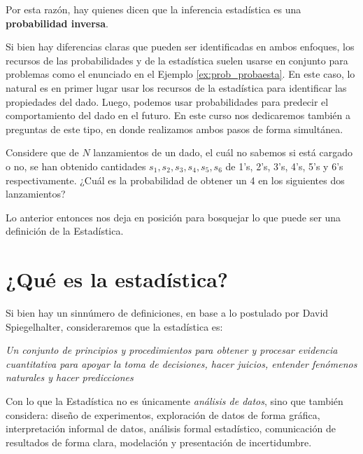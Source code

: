 Por esta razón, hay quienes dicen que la inferencia estadística es una \textbf{probabilidad inversa}.

Si bien hay diferencias claras que pueden ser identificadas en ambos enfoques, los recursos de las probabilidades y de la estadística suelen usarse en conjunto para problemas como el enunciado en el Ejemplo \ref{ex:prob_probaesta}. En este caso, lo natural es en primer lugar usar los recursos de la estadística para identificar las propiedades del dado. Luego, podemos usar probabilidades para predecir el comportamiento del dado en el futuro. En este curso nos dedicaremos también a preguntas de este tipo, en donde realizamos ambos pasos de forma simultánea. 

\begin{example}
\label{ex:prob_probaesta}
Considere que de $N$ lanzamientos de un dado, el cuál no sabemos si está cargado o no, se han obtenido cantidades $s_1,s_2,s_3,s_4,s_5,s_6$ de 1's, 2's, 3's, 4's, 5's y 6's respectivamente. ¿Cuál es la probabilidad de obtener un 4 en los siguientes dos lanzamientos?
\end{example}

Lo anterior entonces nos deja en posición para bosquejar lo que puede ser una definición de la Estadística. 

\section{¿Qué es la estadística?}

Si bien hay un sinnúmero de definiciones, en base a lo postulado por David Spiegelhalter, consideraremos que la estadística es: 
\begin{center}
\it 
    Un conjunto de principios y procedimientos para obtener y procesar evidencia cuantitativa para apoyar la toma de decisiones, hacer juicios, entender fenómenos naturales y hacer predicciones
\end{center}

Con lo que la Estadística no es únicamente \emph{análisis de datos}, sino que también considera: diseño de experimentos, exploración de datos de forma gráfica, interpretación informal de datos, análisis formal estadístico, comunicación de resultados de forma clara, modelación y presentación de incertidumbre. 

